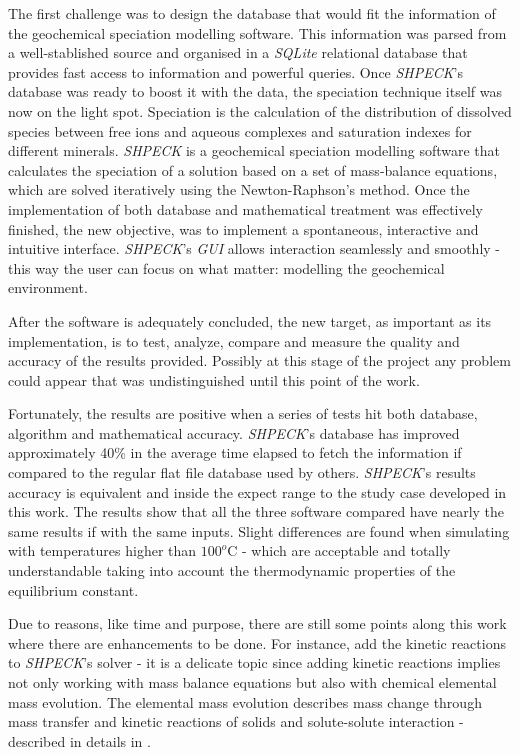 The first challenge was to design the database that would fit the information of the geochemical speciation modelling software. This information was parsed from a well-stablished source and organised in a \emph{SQLite} relational database that provides fast access to information and powerful queries. Once \emph{SHPECK}'s database was ready to boost it with the data, the speciation technique itself was now on the light spot. Speciation is the calculation of the distribution of dissolved species between free ions and aqueous complexes and saturation indexes for different minerals. \emph{SHPECK} is a geochemical speciation modelling software that calculates the speciation of a solution based on a set of mass-balance equations, which are solved iteratively using the Newton-Raphson's method.
Once the implementation of both database and mathematical treatment was effectively finished, the new objective, was to implement a spontaneous, interactive and intuitive interface. \emph{SHPECK}'s \emph{GUI} allows interaction seamlessly and smoothly - this way the user can focus on what matter: modelling the geochemical environment.

After the software is adequately concluded, the new target, as important as its implementation, is to test, analyze, compare and measure the quality and accuracy of the results provided. Possibly at this stage of the project any problem could appear that was undistinguished until this point of the work.

Fortunately, the results are positive when a series of tests hit both database, algorithm and mathematical accuracy.
\emph{SHPECK}'s database has improved approximately 40\% in the average time elapsed to fetch the information if compared to the regular flat file database used by others.
\emph{SHPECK}'s results accuracy is equivalent and inside the expect range to the study case developed in this work. The results show that all the three software compared have nearly the same results if with the same inputs. Slight differences are found when simulating with temperatures higher than $100^o$C - which are acceptable and totally understandable taking into account the thermodynamic properties of the equilibrium constant.

Due to reasons, like time and purpose, there are still some points along this work where there are enhancements to be done. For instance, add the kinetic reactions to \emph{SHPECK}'s solver - it is a  delicate topic since adding kinetic reactions implies not only working with mass balance equations but also with chemical elemental mass evolution. The elemental mass evolution describes mass change through mass transfer and kinetic reactions of solids and solute-solute interaction - described in details in \cite{Ajpark:14}.
\newpage



